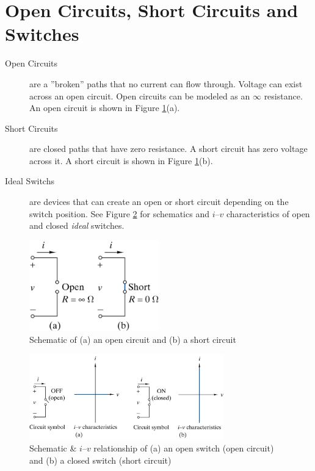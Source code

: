 \documentclass{handout}
\begin{document}
\section{Open Circuits, Short Circuits and Switches}
\begin{description}
\item [Open Circuits] are a ''broken'' paths that no current can flow through.  Voltage can exist across an open circuit.  Open circuits can be modeled as an $\infty$ resistance.  An open circuit is shown in Figure \ref{fig: Open_and_Short_Circuits}(a).
\item [Short Circuits] are closed paths that have zero resistance.  A short circuit has zero voltage across it. A short circuit is shown in Figure \ref{fig: Open_and_Short_Circuits}(b).
\item [Ideal Switchs] are devices that can create an open or short circuit depending on the switch position. See Figure \ref{fig: Switch} for schematics and  $i$--$v$ characteristics of open and closed {\em ideal} switches.
\end{description}

\begin{figure}[h b t]
\centering
\includegraphics[width=0.5\textwidth]{Open_and_Short_Circuits.jpg}
\caption{Schematic of (a) an open circuit and (b) a short circuit}
\label{fig: Open_and_Short_Circuits}
\end{figure}

\begin{figure}[h b t]
\centering
\includegraphics[width=0.75\textwidth]{Switch.jpg}
\caption{Schematic \& $i$--$v$ relationship of (a) an open switch (open circuit) and (b) a closed switch (short circuit)}
\label{fig: Switch}
\end{figure}
\end{document}
